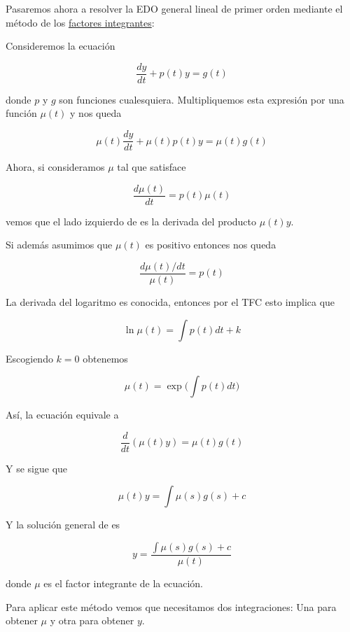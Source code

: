 Pasaremos ahora a resolver la EDO general lineal de primer orden mediante el método de los \ul{factores integrantes}:

Consideremos la ecuación

\begin{equation}\label{eq:met_integrantes1}
    \frac{dy}{dt} + p(t)y = g(t)
\end{equation}

donde $p$ y $g$ son funciones cualesquiera. Multipliquemos esta expresión por una función $\mu(t)$ y nos queda

\begin{equation}\label{eq:met_integrantes2}
    \mu(t)\frac{dy}{dt} + \mu(t)p(t)y = \mu(t)g(t)
\end{equation}

Ahora, si consideramos $\mu$ tal que satisface

\begin{equation}\label{eq:met_integrantes3}
    \frac{d\mu(t)}{dt} = p(t)\mu(t)
\end{equation}

vemos que el lado izquierdo de  es la derivada del producto $\mu(t)y$.

Si además asumimos que $\mu(t)$ es positivo entonces nos queda

\[
    \frac{d\mu(t)/dt}{\mu(t)} = p(t)
\]

La derivada del logaritmo es conocida, entonces por el TFC esto implica que

\[
    \ln\mu(t) = \int p(t)dt + k
\]

Escogiendo $k = 0$ obtenemos

\[
    \mu(t) = \exp \big( \int p(t)dt \big)
\]

Así, la ecuación  equivale a

\[
    \frac{d}{dt}(\mu(t)y) = \mu(t)g(t)
\]

Y se sigue que

\[
    \mu(t)y = \int \mu(s)g(s) + c
\]

Y la solución general de  es

\[
    y = \displaystyle \frac{\int \mu(s)g(s) + c}{\mu(t)}
\]

donde $\mu$ es el factor integrante de la ecuación.

Para aplicar este método vemos que necesitamos dos integraciones: Una para obtener $\mu$ y otra para obtener $y$.